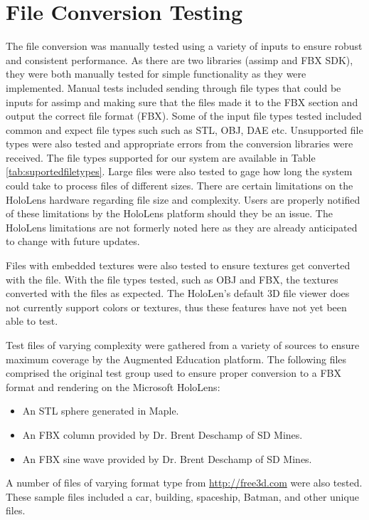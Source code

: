
\section{File Conversion Testing}
\tab
    The file conversion was manually tested using a variety of inputs to ensure robust and consistent performance. As there are two libraries (assimp and FBX SDK), they were both manually tested for simple functionality as they were implemented. Manual tests included sending through file types that could be inputs for assimp and making sure that the files made it to the FBX section and output the correct file format (FBX). Some of the input file types tested included common and expect file types such such as STL, OBJ, DAE etc. Unsupported file types were also tested and appropriate errors from the conversion libraries were received. The file types supported for our system are available in Table \ref{tab:suportedfiletypes}. Large files were also tested to gage how long the system could take to process files of different sizes. There are certain limitations on the HoloLens hardware regarding file size and complexity. Users are properly notified of these limitations by the HoloLens platform should they be an issue. The HoloLens limitations are not formerly noted here as they are already anticipated to change with future updates.  

    Files with embedded textures were also tested to ensure textures get converted with the file. With the file types tested, such as OBJ and FBX, the textures converted with the files as expected. The HoloLen's default 3D file viewer does not currently support colors or textures, thus these features have not yet been able to test.

    Test files of varying complexity were gathered from a variety of sources to ensure maximum coverage by the Augmented Education platform. The following files comprised the original test group used to ensure proper conversion to a FBX format and rendering on the Microsoft HoloLens:
    \begin{itemize}
        \item An STL sphere generated in Maple.
        \item An FBX column provided by Dr. Brent Deschamp of SD Mines.
        \item An FBX sine wave provided by Dr. Brent Deschamp of SD Mines.
    \end{itemize} 
    
    A number of files of varying format type from \url{http://free3d.com} were also tested. These sample files included a car, building, spaceship, Batman, and other unique files. 
    
